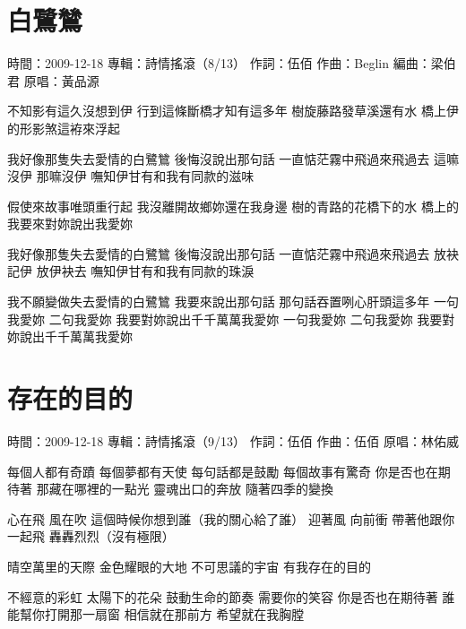 \documentclass[UTF8,a4paper,oneside,twocolumn,12pt]{ctexbook}
\newcommand{\infopair}[2]{\textbullet #1：#2}
\newcommand{\zc}[1][伍佰]{\infopair{作詞}{#1}}
\newcommand{\zq}[1][伍佰]{\infopair{作曲}{#1}}
\newcommand{\bq}[1][伍佰]{\infopair{編曲}{#1}}
\newcommand{\zj}[1]{\infopair{專輯}{#1}}
\newcommand{\yc}[1]{\infopair{原唱}{#1}}
\newcommand{\sj}[1]{\infopair{時間}{#1}}
\newenvironment{info}{\begin{flushleft}\kaishu
	}
	{\end{flushleft}\normalsize\yahei\par}
\newenvironment{lyric}{
	}
{}
\begin{document}
\section{白鷺鷥}
\begin{info}
	\sj{2009-12-18}
	\zj{詩情搖滾（8/13）}
	\zc
	\zq[Beglin]
	\bq[梁伯君]
	\yc{黃品源}
\end{info}
\begin{lyric}
	不知影有這久沒想到伊 行到這條斷橋才知有這多年
	樹旋藤路發草溪還有水 橋上伊的形影煞這袸來浮起

	我好像那隻失去愛情的白鷺鷥 後悔沒說出那句話
	一直惦茫霧中飛過來飛過去 這嘛沒伊 那嘛沒伊
	嘸知伊甘有和我有同款的滋味

	假使來故事唯頭重行起 我沒離開故鄉妳還在我身邊
	樹的青路的花橋下的水 橋上的我要來對妳說出我愛妳

	我好像那隻失去愛情的白鷺鷥 後悔沒說出那句話
	一直惦茫霧中飛過來飛過去 放袂記伊 放伊袂去
	嘸知伊甘有和我有同款的珠淚

	我不願變做失去愛情的白鷺鷥 我要來說出那句話
	那句話吞置咧心肝頭這多年
	一句我愛妳 二句我愛妳 我要對妳說出千千萬萬我愛妳
	一句我愛妳 二句我愛妳 我要對妳說出千千萬萬我愛妳
\end{lyric}

\section{存在的目的}
\begin{info}
	\sj{2009-12-18}
	\zj{詩情搖滾（9/13）}
	\zc
	\zq
	\yc{林佑威}
\end{info}
\begin{lyric}
	每個人都有奇蹟 每個夢都有天使
	每句話都是鼓勵 每個故事有驚奇
	你是否也在期待著 那藏在哪裡的一點光
	靈魂出口的奔放 隨著四季的變換

	心在飛 風在吹 這個時候你想到誰（我的關心給了誰）
	迎著風 向前衝 帶著他跟你一起飛 轟轟烈烈（沒有極限）

	晴空萬里的天際 金色耀眼的大地
	不可思議的宇宙 有我存在的目的

	不經意的彩虹 太陽下的花朵
	鼓動生命的節奏 需要你的笑容
	你是否也在期待著 誰能幫你打開那一扇窗
	相信就在那前方 希望就在我胸膛
\end{lyric}
\end{document}
